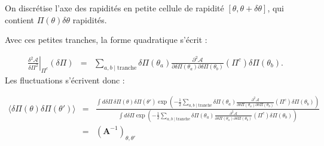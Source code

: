 \begin{figure}[H]
	\centering 
	\captionsetup{skip=10pt} %
	\label{fig.fluctu.A}
\end{figure}


On discrétise l'axe des rapidités en  petite cellule de rapidité $[\theta, \theta+\delta\theta]$, qui contient $\Pi(\theta) \delta \theta$ rapidités. 
	



Avec ces petites tranches, la forme quadratique s’écrit :

\begin{eqnarray*}
    \left. \frac{\delta^2 \mathcal{A}}{\delta \Pi^2} \right|_{\Pi^c}(\delta \Pi ) &=&  \sum_{a,b \mid \text{tranche}}  
    \delta \Pi(\theta_a)  \frac{\partial^2 \mathcal{A}}{\partial \delta \Pi(\theta_a) \partial \delta \Pi(\theta_b) } (\Pi^c)  \delta \Pi(\theta_b).
\end{eqnarray*}
Les fluctuations s’écrivent donc :

\begin{eqnarray*}
    \langle \delta \Pi ( \theta) \delta \Pi ( \theta') \rangle &=&  
    \frac{ \int d\delta \Pi \, \delta \Pi(\theta) \delta \Pi ( \theta') 
    \exp \left( - \frac{1}{2} \sum_{a,b \mid \text{tranche}}  
    \delta \Pi(\theta_a) \frac{\partial^2 \mathcal{A}}{\partial \delta \Pi(\theta_a) \partial \delta \Pi(\theta_b) } (\Pi^c)  \delta \Pi(\theta_b) \right) }
    { \int d\delta \Pi  
    \exp \left( - \frac{1}{2} \sum_{a,b \mid \text{tranche}}  
    \delta \Pi(\theta_a) \frac{\partial^2 \mathcal{A}}{\partial \delta \Pi(\theta_a) \partial \delta \Pi(\theta_b) } (\Pi^c)  \delta \Pi(\theta_b) \right) } \\
    &=& \left( \mathbf{A}^{-1} \right)_{\theta , \theta'}
\end{eqnarray*}

